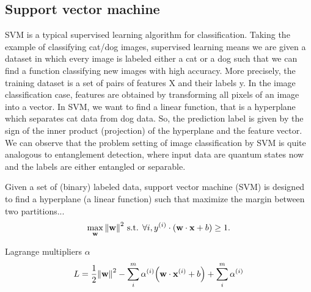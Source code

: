 \subsection{Support vector machine}\label{sec:svm}
SVM is a typical supervised learning algorithm for classification. Taking the example of classifying cat/dog images, supervised learning means we are given a dataset in which every image is labeled either a cat or a dog such that we can find a function classifying new images with high accuracy. More precisely,  the training dataset is a set of pairs of features X and their labels y. In the image classification case, features are obtained by transforming all pixels of an image into a vector. In SVM, we want to find a linear function, that is a hyperplane which separates cat data from dog data. So, the prediction label is given by the sign of the inner product (projection) of the hyperplane and the feature vector. We can observe that the problem setting of image classification by SVM is quite analogous to entanglement detection, where input data are quantum states now and the labels are either entangled or separable.


\begin{definition}[SVM]\label{def:svm}
	Given a set of (binary) labeled data,
	support vector machine (SVM) is designed to
	find a hyperplane (a linear function) such that maximize the margin between two partitions...
	\begin{equation}
		\max_{\vb{w}}
		\norm{\vb{w}}^2
		\text{ s.t. }
		\forall i , y^{(i)}\cdot (\vb{w}\cdot\vb{x}+b)\ge 1.
	\end{equation}
\end{definition}
Lagrange multipliers $\alpha$
\begin{equation}
	L = \frac{1}{2}\norm{\vb{w}}^2 - \sum_i^m \alpha^{(i)} \qty(\vb{w}\cdot \vb{x}^{(i)} + b) + \sum_i^m \alpha^{(i)}
\end{equation}

